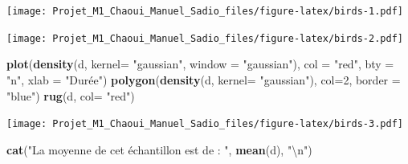 \documentclass[
]{book}
\newenvironment{Shaded}{\begin{snugshade}}{\end{snugshade}}
\newcommand{\CharTok}[1]{\textcolor[rgb]{0.31,0.60,0.02}{#1}}
\newcommand{\CommentTok}[1]{\textcolor[rgb]{0.56,0.35,0.01}{\textit{#1}}}
\newcommand{\DataTypeTok}[1]{\textcolor[rgb]{0.13,0.29,0.53}{#1}}
\newcommand{\DecValTok}[1]{\textcolor[rgb]{0.00,0.00,0.81}{#1}}
\newcommand{\KeywordTok}[1]{\textcolor[rgb]{0.13,0.29,0.53}{\textbf{#1}}}
\newcommand{\NormalTok}[1]{#1}
\newcommand{\OperatorTok}[1]{\textcolor[rgb]{0.81,0.36,0.00}{\textbf{#1}}}
\newcommand{\StringTok}[1]{\textcolor[rgb]{0.31,0.60,0.02}{#1}}
\begin{document}
\texttt{[image: Projet\_M1\_Chaoui\_Manuel\_Sadio\_files/figure-latex/birds-1.pdf]}

\begin{Shaded}
\end{Shaded}

\texttt{[image: Projet\_M1\_Chaoui\_Manuel\_Sadio\_files/figure-latex/birds-2.pdf]}

\begin{Shaded}
\begin{Highlighting}[]
\KeywordTok{plot}\NormalTok{(}\KeywordTok{density}\NormalTok{(d, }\DataTypeTok{kernel=} \StringTok{"gaussian"}\NormalTok{, }\DataTypeTok{window =} \StringTok{"gaussian"}\NormalTok{),}
     \DataTypeTok{col =} \StringTok{"red"}\NormalTok{, }\DataTypeTok{bty =} \StringTok{"n"}\NormalTok{, }\DataTypeTok{xlab =} \StringTok{"Durée"}\NormalTok{)}
\KeywordTok{polygon}\NormalTok{(}\KeywordTok{density}\NormalTok{(d, }\DataTypeTok{kernel=} \StringTok{"gaussian"}\NormalTok{), }\DataTypeTok{col=}\DecValTok{2}\NormalTok{, }\DataTypeTok{border =} \StringTok{"blue"}\NormalTok{)}
\KeywordTok{rug}\NormalTok{(d, }\DataTypeTok{col=} \StringTok{"red"}\NormalTok{)}
\end{Highlighting}
\end{Shaded}

\texttt{[image: Projet\_M1\_Chaoui\_Manuel\_Sadio\_files/figure-latex/birds-3.pdf]}

\begin{Shaded}
\begin{Highlighting}[]
\KeywordTok{cat}\NormalTok{(}\StringTok{"La moyenne de cet échantillon est de : "}\NormalTok{, }\KeywordTok{mean}\NormalTok{(d), }\StringTok{"}\CharTok{\textbackslash{}n}\StringTok{"}\NormalTok{)}
\end{Highlighting}
\end{Shaded}
\end{document}
